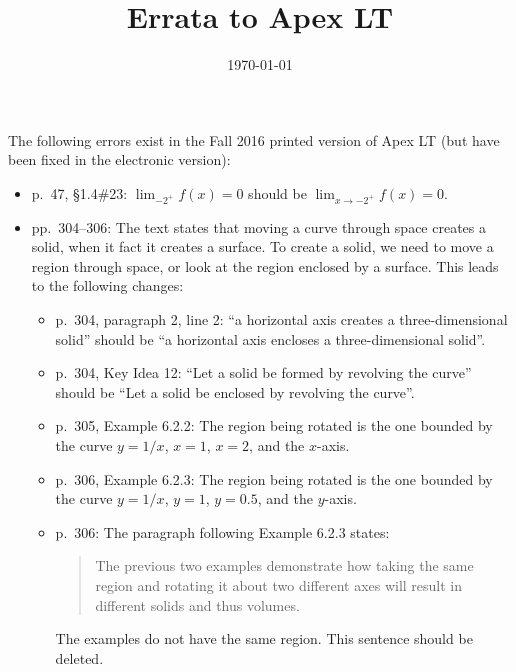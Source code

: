 \documentclass{article}
\title{Errata to Apex LT}
\date{\today}
\newcommand{\ds}{\displaystyle}
\begin{document}
\maketitle

The following errors exist in the Fall 2016 printed version of Apex LT (but have been fixed in the electronic version):
\begin{itemize}
\item p.\ 47, \S1.4\#23: $\ds\lim_{-2^+}f(x)=0$ should be $\ds\lim_{x\to-2^+}f(x)=0$.
\item pp.\ 304--306: The text states that moving a curve through space creates a solid, when it fact it creates a surface.  To create a solid, we need to move a region through space, or look at the region enclosed by a surface.  This leads to the following changes:
\begin{itemize}
\item p.\ 304, paragraph 2, line 2: ``a horizontal axis creates a three-dimensional solid'' should be ``a horizontal axis encloses a three-dimensional solid''.
\item p.\ 304, Key Idea 12: ``Let a solid be formed by revolving the curve'' should be ``Let a solid be enclosed by revolving the curve''.
\item p.\ 305, Example 6.2.2: The region being rotated is the one bounded by the curve $y=1/x$, $x=1$, $x=2$, and the $x$-axis.
\item p.\ 306, Example 6.2.3: The region being rotated is the one bounded by the curve $y=1/x$, $y=1$, $y=0.5$, and the $y$-axis.
\item p.\ 306: The paragraph following Example 6.2.3 states:
\begin{quote}
The previous two examples demonstrate how taking the same region and rotating it about two different axes will result in different solids and thus volumes.
\end{quote}
The examples do not have the same region.  This sentence should be deleted.
\end{itemize}
\end{itemize}
\end{document}
